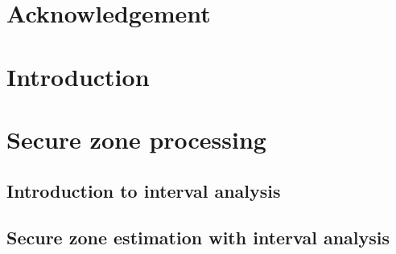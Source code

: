 \documentclass[12pt,fleqn]{report} %
\begin{document}
\renewcommand{\contentsname}{Contents}	%
\renewcommand{\bibname}{Bibliography}	%





\tableofcontents  %
\cleardoublepage  %


\chapter*{Acknowledgement}



\chapter{Introduction}



\chapter{Secure zone processing}

\section{Introduction to interval analysis}


\section{Secure zone estimation with interval analysis}

\end{document}
